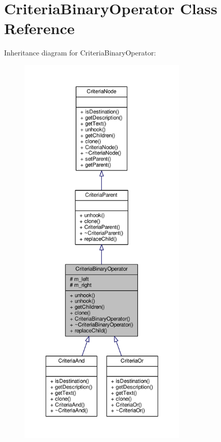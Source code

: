 \hypertarget{classCriteriaBinaryOperator}{}\section{Criteria\+Binary\+Operator Class Reference}
\label{classCriteriaBinaryOperator}


Inheritance diagram for Criteria\+Binary\+Operator\+:
\nopagebreak
\begin{figure}[H]
\begin{center}
\leavevmode
\includegraphics[height=550pt]{d2/d8b/classCriteriaBinaryOperator__inherit__graph}
\end{center}
\end{figure}


